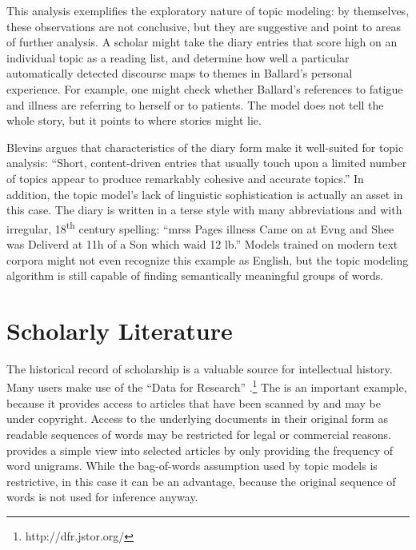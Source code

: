 This analysis exemplifies the exploratory nature of topic modeling: by themselves, these observations are not conclusive, but they are suggestive and point to areas of further analysis.
A scholar might take the diary entries that score high on an individual topic as a reading list, and determine how well a particular automatically detected discourse maps to themes in Ballard's personal experience.
For example, one might check whether Ballard's references to fatigue and illness are referring to herself or to patients.
The model does not tell the whole story, but it points to where stories might lie.

Blevins argues that characteristics of the diary form make it well-suited for topic analysis: ``Short, content-driven entries that usually touch upon a limited number of topics appear to produce remarkably cohesive and accurate topics.''
In addition, the topic model's lack of linguistic sophistication is actually an asset in this case.
The diary is written in a terse style with many abbreviations and with irregular, 18\textsuperscript{th} century spelling: ``mrss Pages illness Came on at Evng and Shee was Deliverd at 11h of a Son which waid 12 lb.''
Models trained on modern text corpora might not even recognize this example as English, but the topic modeling algorithm is still capable of finding semantically meaningful groups of words.



\section{Scholarly Literature}
\label{sec:scholarly}


The historical record of scholarship is a valuable source for intellectual history.
Many users make use of the  ``Data for Research'' .\footnote{http://dfr.jstor.org/}
The  is an important example, because it provides access to articles that have been scanned by  and may be under copyright.
Access to the underlying documents in their original form as readable sequences of words may be restricted for legal or commercial reasons.
 provides a simple view into selected articles by only providing the frequency of word unigrams.
While the bag-of-words assumption used by topic models is restrictive, in this case it can be an advantage, because the original sequence of words is not used for inference anyway.

